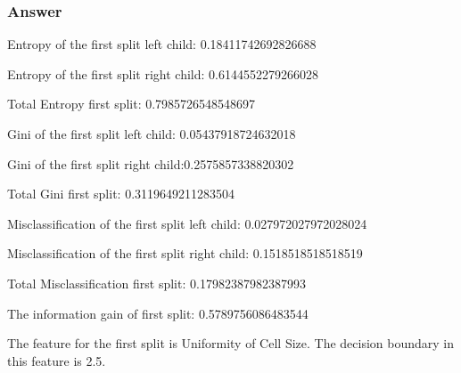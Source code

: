 \documentclass[11pt]{article}
\begin{document}
    \subsubsection{Answer}\label{answer}

Entropy of the first split left child: 0.18411742692826688

Entropy of the first split right child: 0.6144552279266028

Total Entropy first split: 0.7985726548548697

Gini of the first split left child: 0.05437918724632018

Gini of the first split right child:0.2575857338820302

Total Gini first split: 0.3119649211283504

Misclassification of the first split left child: 0.027972027972028024

Misclassification of the first split right child: 0.1518518518518519

Total Misclassification first split: 0.17982387982387993

The information gain of first split: 0.5789756086483544

The feature for the first split is Uniformity of Cell Size. The decision
boundary in this feature is 2.5.
\end{document}
